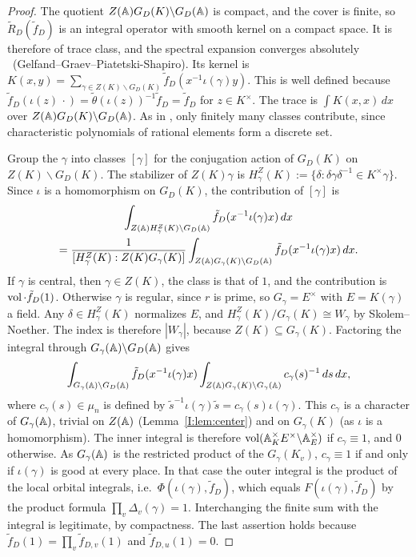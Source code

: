 \begin{proof}
The quotient $Z(\mathbb{A})G_D(K)\backslash G_D(\mathbb{A})$ is compact, and the cover is finite, so $\tilde R_D(\tilde f_D)$ is an integral operator with smooth kernel on a compact space. It is therefore of trace class, and the spectral expansion converges absolutely \Ev\ (Gelfand--Graev--Piatetski-Shapiro). Its kernel is $K(x,y)=\sum_{\gamma\in Z(K)\backslash G_D(K)}\tilde f_D(x^{-1}\iota(\gamma)y)$. This is well defined because $\tilde f_D(\iota(z)\,\cdot)=\tilde\theta(\iota(z))^{-1}\tilde f_D=\tilde f_D$ for $z\in K^\times$. The trace is $\int K(x,x)\,dx$ over $Z(\mathbb{A})G_D(K)\backslash G_D(\mathbb{A})$. As in \cite[\S18]{FK86}, only finitely many classes contribute, since characteristic polynomials of rational elements form a discrete set.

Group the $\gamma$ into classes $[\gamma]$ for the conjugation action of $G_D(K)$ on $Z(K)\backslash G_D(K)$. The stabilizer of $Z(K)\gamma$ is $H^Z_\gamma(K):=\{\delta:\delta\gamma\delta^{-1}\in K^\times\gamma\}$. Since $\iota$ is a homomorphism on $G_D(K)$, the contribution of $[\gamma]$ is
\begin{multline*} \int_{Z(\mathbb{A})H^Z_\gamma(K)\backslash G_D(\mathbb{A})}\tilde f_D(x^{-1}\iota(\gamma)x)\,dx\\=\frac1{[H^Z_\gamma(K):Z(K)G_\gamma(K)]}\int_{Z(\mathbb{A})G_\gamma(K)\backslash G_D(\mathbb{A})}\tilde f_D(x^{-1}\iota(\gamma)x)\,dx. \end{multline*}
If $\gamma$ is central, then $\gamma\in Z(K)$, the class is that of $1$, and the contribution is $\operatorname{vol}\cdot\tilde f_D(1)$. Otherwise $\gamma$ is regular, since $r$ is prime, so $G_\gamma=E^\times$ with $E=K(\gamma)$ a field. Any $\delta\in H^Z_\gamma(K)$ normalizes $E$, and $H^Z_\gamma(K)/G_\gamma(K)\cong W_\gamma$ by Skolem--Noether. The index is therefore $|W_\gamma|$, because $Z(K)\subseteq G_\gamma(K)$. Factoring the integral through $G_\gamma(\mathbb{A})\backslash G_D(\mathbb{A})$ gives
\[ \int_{G_\gamma(\mathbb{A})\backslash G_D(\mathbb{A})}\tilde f_D(x^{-1}\iota(\gamma)x)\int_{Z(\mathbb{A})G_\gamma(K)\backslash G_\gamma(\mathbb{A})}c_\gamma(s)^{-1}\,ds\,dx, \]
where $c_\gamma(s)\in\mu_n$ is defined by $\tilde s^{-1}\iota(\gamma)\tilde s=c_\gamma(s)\iota(\gamma)$. This $c_\gamma$ is a character of $G_\gamma(\mathbb{A})$, trivial on $Z(\mathbb{A})$ (Lemma~\ref{I:lem:center}) and on $G_\gamma(K)$ (as $\iota$ is a homomorphism). The inner integral is therefore $\operatorname{vol}(\mathbb{A}_K^\times E^\times\backslash\mathbb{A}_E^\times)$ if $c_\gamma\equiv1$, and $0$ otherwise. As $G_\gamma(\mathbb{A})$ is the restricted product of the $G_\gamma(K_v)$, $c_\gamma\equiv1$ if and only if $\iota(\gamma)$ is good at every place. In that case the outer integral is the product of the local orbital integrals, i.e.\ $\Phi(\iota(\gamma),\tilde f_D)$, which equals $F(\iota(\gamma),\tilde f_D)$ by the product formula $\prod_v\Delta_v(\gamma)=1$. Interchanging the finite sum with the integral is legitimate, by compactness. The last assertion holds because $\tilde f_D(1)=\prod_v\tilde f_{D,v}(1)$ and $\tilde f_{D,u}(1)=0$.
\end{proof}

